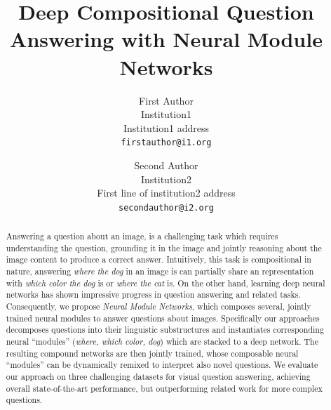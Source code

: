 \documentclass[10pt,twocolumn,letterpaper]{article}
\begin{document}
\newcommand{\nmn}{Neural Module Networks\xspace}
\newcommand{\mod}[1]{{\small\texttt{#1}}}
\newcommand{\todo}{\textcolor{red}}

\title{Deep Compositional Question Answering with Neural Module Networks}

\author{First Author\\
Institution1\\
Institution1 address\\
{\tt\small firstauthor@i1.org}
\and
Second Author\\
Institution2\\
First line of institution2 address\\
{\tt\small secondauthor@i2.org}
}

\maketitle

\begin{abstract}
Answering a question about an image, is a challenging task which requires understanding the question, grounding it in the image and jointly reasoning about the image content to produce a correct answer. Intuitively, this task is compositional in nature, \ie answering \emph{where the dog} in an image is can partially share an representation with \emph{which color the dog} is or \emph{where the cat} is. On the other hand, learning deep neural networks has shown impressive progress in question answering and related tasks. Consequently, we propose \emph{\nmn}, which composes several, jointly trained neural modules to answer questions about images. Specifically our approaches decomposes questions into their linguistic substructures and instantiates corresponding neural ``modules'' (\eg \emph{where, which color, dog}) which are stacked to a deep network. The resulting compound
  networks are then jointly trained, whose composable neural ``modules'' 
  can be dynamically remixed to interpret also novel questions. We evaluate our approach
  on three challenging datasets for visual question answering, achieving
   overall state-of-the-art performance, but outperforming related work for more complex questions.
\end{abstract}
\end{document}
